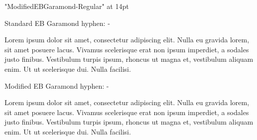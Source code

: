 \fontfam[ebgaramond]
\typosize[14/18]

\hsize=50mm
\parskip\baselineskip
\parindent0pt

\font\modeb "ModifiedEBGaramond-Regular" at 14pt\relax

Standard EB Garamond hyphen: {-}\par

Lorem ipsum dolor sit amet, consectetur adipiscing elit. Nulla eu gravida lorem, sit amet posuere lacus. Vivamus scelerisque erat non ipsum imperdiet, a sodales justo finibus. Vestibulum turpis ipsum, rhoncus ut magna et, vestibulum aliquam enim. Ut ut scelerisque dui. Nulla facilisi. 
\modeb

Modified EB Garamond hyphen: -

Lorem ipsum dolor sit amet, consectetur adipiscing elit. Nulla eu gravida lorem, sit amet posuere lacus. Vivamus scelerisque erat non ipsum imperdiet, a sodales justo finibus. Vestibulum turpis ipsum, rhoncus ut magna et, vestibulum aliquam enim. Ut ut scelerisque dui. Nulla facilisi. 

\bye
